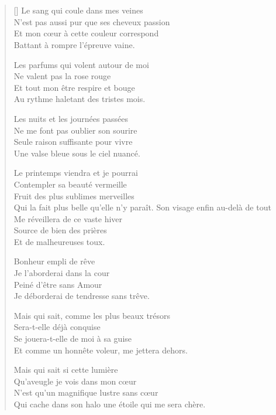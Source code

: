 \section{\hfill}

\settowidth{\versewidth}{Qui cache dans son halo une étoile qui me sera chère.}
\begin{verse}[\versewidth]
Le sang qui coule dans mes veines \\
N'est pas aussi pur que ses cheveux passion \\
Et mon cœur à cette couleur correspond \\
Battant à rompre l'épreuve vaine.

Les parfums qui volent autour de moi \\
Ne valent pas la rose rouge \\
Et tout mon être respire et bouge \\
Au rythme haletant des tristes mois.

Les nuits et les journées passées \\
Ne me font pas oublier son sourire \\
Seule raison suffisante pour vivre \\
Une valse bleue sous le ciel nuancé.

Le printemps viendra et je pourrai \\
Contempler sa beauté vermeille \\
Fruit des plus sublimes merveilles \\
Qui la fait plus belle qu'elle n'y paraît.
\newpage
Son visage enfin au-delà de tout \\
Me réveillera de ce vaste hiver \\
Source de bien des prières \\
Et de malheureuses toux.

Bonheur empli de rêve \\
Je l'aborderai dans la cour \\
Peiné d'être sans Amour \\
Je déborderai de tendresse sans trêve.

Mais qui sait, comme les plus beaux trésors \\
Sera-t-elle déjà conquise \\
Se jouera-t-elle de moi à sa guise \\
Et comme un honnête voleur, me jettera dehors.

Mais qui sait si cette lumière \\
Qu'aveugle je vois dans mon cœur \\
N'est qu'un magnifique lustre sans cœur \\
Qui cache dans son halo une étoile qui me sera chère.
\end{verse}

